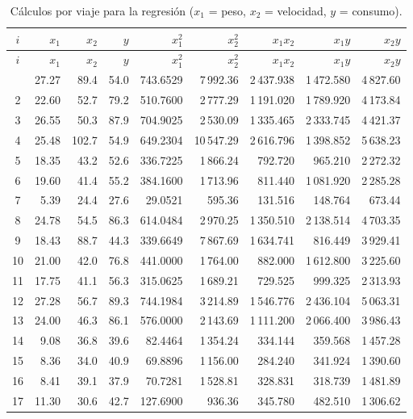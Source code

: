 \documentclass[12pt,letterpaper]{article}
\begin{document}
{\footnotesize
\setlength{\tabcolsep}{4pt}
\begin{longtable}{|c||r|r|r||r|r|r|r|r|}
\caption{Cálculos por viaje para la regresión ($x_1$ = peso, $x_2$ = velocidad, $y$ = consumo).}\label{tab:sumas}\\
\hline
$i$ & $x_1$ & $x_2$ & $y$ & $x_1^2$ & $x_2^2$ & $x_1 x_2$ & $x_1 y$ & $x_2 y$ \\
\hline\hline
\endfirsthead
\hline
$i$ & $x_1$ & $x_2$ & $y$ & $x_1^2$ & $x_2^2$ & $x_1 x_2$ & $x_1 y$ & $x_2 y$ \\
\hline\hline
\endhead
\hline
\endfoot
1 & 27.27 & 89.4 & 54.0 & 743.6529 & 7\,992.36 & 2\,437.938 & 1\,472.580 & 4\,827.60 \\
2 & 22.60 & 52.7 & 79.2 & 510.7600 & 2\,777.29 & 1\,191.020 & 1\,789.920 & 4\,173.84 \\
3 & 26.55 & 50.3 & 87.9 & 704.9025 & 2\,530.09 & 1\,335.465 & 2\,333.745 & 4\,421.37 \\
4 & 25.48 & 102.7 & 54.9 & 649.2304 & 10\,547.29 & 2\,616.796 & 1\,398.852 & 5\,638.23 \\
5 & 18.35 & 43.2 & 52.6 & 336.7225 & 1\,866.24 & 792.720 & 965.210 & 2\,272.32 \\
6 & 19.60 & 41.4 & 55.2 & 384.1600 & 1\,713.96 & 811.440 & 1\,081.920 & 2\,285.28 \\
7 & 5.39 & 24.4 & 27.6 & 29.0521 & 595.36 & 131.516 & 148.764 & 673.44 \\
8 & 24.78 & 54.5 & 86.3 & 614.0484 & 2\,970.25 & 1\,350.510 & 2\,138.514 & 4\,703.35 \\
9 & 18.43 & 88.7 & 44.3 & 339.6649 & 7\,867.69 & 1\,634.741 & 816.449 & 3\,929.41 \\
10 & 21.00 & 42.0 & 76.8 & 441.0000 & 1\,764.00 & 882.000 & 1\,612.800 & 3\,225.60 \\
11 & 17.75 & 41.1 & 56.3 & 315.0625 & 1\,689.21 & 729.525 & 999.325 & 2\,313.93 \\
12 & 27.28 & 56.7 & 89.3 & 744.1984 & 3\,214.89 & 1\,546.776 & 2\,436.104 & 5\,063.31 \\
13 & 24.00 & 46.3 & 86.1 & 576.0000 & 2\,143.69 & 1\,111.200 & 2\,066.400 & 3\,986.43 \\
14 & 9.08 & 36.8 & 39.6 & 82.4464 & 1\,354.24 & 334.144 & 359.568 & 1\,457.28 \\
15 & 8.36 & 34.0 & 40.9 & 69.8896 & 1\,156.00 & 284.240 & 341.924 & 1\,390.60 \\
16 & 8.41 & 39.1 & 37.9 & 70.7281 & 1\,528.81 & 328.831 & 318.739 & 1\,481.89 \\
17 & 11.30 & 30.6 & 42.7 & 127.6900 & 936.36 & 345.780 & 482.510 & 1\,306.62 \\

\end{longtable}}
\end{document}
